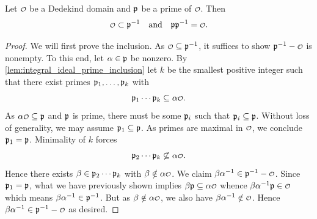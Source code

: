     \begin{lemma}\label{lem:inverse_for_prime_ideals}
      Let \(\smc{O}\) be a Dedekind domain and \(\mathfrak{p}\) be a prime of \(\smc{O}\). Then
      \[
        \smc{O} \subset \mf{p}^{-1} \quad \text{and} \quad \mf{p}\mf{p}^{-1} = \smc{O}.
      \]
    \end{lemma}
    \begin{proof}
      We will first prove the inclusion. As \(\smc{O} \subseteq \mf{p}^{-1}\), it suffices to show \(\mf{p}^{-1}-\smc{O}\) is nonempty. To this end, let \(\alpha \in \mathfrak{p}\) be nonzero. By \cref{lem:integral_ideal_prime_inclusion} let \(k\) be the smallest positive integer such that there exist primes \(\mathfrak{p}_{1},\ldots,\mathfrak{p}_{k}\) with
      \[
        \mf{p}_{1} \cdots \mf{p}_{k} \subseteq \a\smc{O}.
      \]
      As \(\a\smc{O} \subseteq \mf{p}\) and \(\mathfrak{p}\) is prime, there must be some \(\mathfrak{p}_{i}\) such that \(\mathfrak{p}_{i} \subseteq \mathfrak{p}\). Without loss of generality, we may assume \(\mathfrak{p}_{1} \subseteq \mathfrak{p}\). As primes are maximal in \(\smc{O}\), we conclude \(\mathfrak{p}_{1} = \mathfrak{p}\). Minimality of \(k\) forces
      \[
        \mf{p}_{2} \cdots \mf{p}_{k} \not\subseteq \a\smc{O}.
      \]
      Hence there exists \(\beta \in \mathfrak{p}_{2} \cdots \mathfrak{p}_{k}\) with \(\b \notin \a\smc{O}\). We claim \(\b\a^{-1} \in \mf{p}^{-1}-\smc{O}\). Since \(\mathfrak{p}_{1} = \mathfrak{p}\), what we have previously shown implies \(\b\mf{p} \subseteq \a\smc{O}\) whence \(\b\a^{-1}\mf{p} \in \smc{O}\) which means \(\beta\alpha^{-1} \in \mathfrak{p}^{-1}\). But as \(\b \notin \a\smc{O}\), we also have \(\b\a^{-1} \notin \smc{O}\). Hence \(\b\a^{-1} \in \mf{p}^{-1}-\smc{O}\) as desired.
        

\end{proof}
